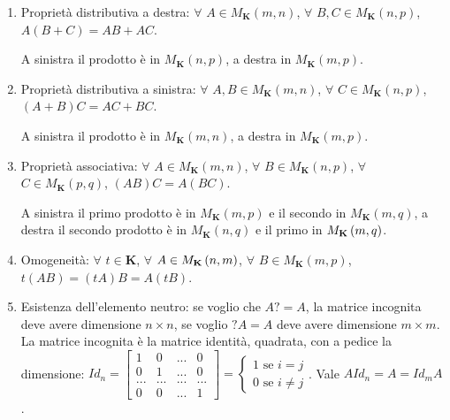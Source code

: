 \documentclass{article}
\begin{document}
\begin{enumerate}
\item Propriet\`{a} distributiva a destra: $\forall $ $A\in M_{\mathbf{K}%
}\left( m,n\right) $, $\forall $ $B,C\in M_{\mathbf{K}}\left( n,p\right) $, $%
A\left( B+C\right) =AB+AC$.

A sinistra il prodotto \`{e} in $M_{\mathbf{K}}\left( n,p\right) $, a destra
in $M_{\mathbf{K}}\left( m,p\right) $.

\item Propriet\`{a} distributiva a sinistra: $\forall $ $A,B\in M_{\mathbf{K}%
}\left( m,n\right) $, $\forall $ $C\in M_{\mathbf{K}}\left( n,p\right) $, $%
\left( A+B\right) C=AC+BC$.

A sinistra il prodotto \`{e} in $M_{\mathbf{K}}\left( m,n\right) $, a destra
in $M_{\mathbf{K}}\left( m,p\right) $.

\item Propriet\`{a} associativa: $\forall $ $A\in M_{\mathbf{K}}\left(
m,n\right) $, $\forall $ $B\in M_{\mathbf{K}}\left( n,p\right) $, $\forall $ 
$C\in M_{\mathbf{K}}\left( p,q\right) $, $\left( AB\right) C=A\left(
BC\right) $.

A sinistra il primo prodotto \`{e} in $M_{\mathbf{K}}\left( m,p\right) $ e
il secondo in $M_{\mathbf{K}}\left( m,q\right) $, a destra il secondo
prodotto \`{e} in $M_{\mathbf{K}}\left( n,q\right) $ e il primo in $M_{%
\mathbf{K}}\left( m,q\right) $.

\item Omogeneit\`{a}: $\forall $ $t\in \mathbf{K}$, $\forall $ $A\in M_{%
\mathbf{K}}\left( n,m\right) $, $\forall $ $B\in M_{\mathbf{K}}\left(
m,p\right) $, $t\left( AB\right) =\left( tA\right) B=A\left( tB\right) $.

\item Esistenza dell'elemento neutro: se voglio che $A?=A$, la matrice
incognita deve avere dimensione $n\times n$, se voglio $?A=A$ deve avere
dimensione $m\times m$. La matrice incognita \`{e} la matrice identit\`{a},
quadrata, con a pedice la dimensione: $Id_{n}=\left[ 
\begin{array}{cccc}
1 & 0 & ... & 0 \\ 
0 & 1 & ... & 0 \\ 
... & ... & ... & ... \\ 
0 & 0 & ... & 1%
\end{array}%
\right] =\left\{ 
\begin{array}{c}
1\text{ se }i=j \\ 
0\text{ se }i\neq j%
\end{array}%
\right. $. Vale $AId_{n}=A=Id_{m}A$.
\end{enumerate}
\end{document}
